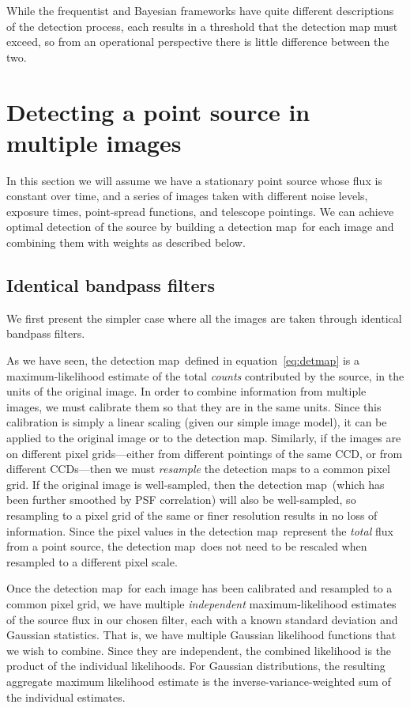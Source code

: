 \documentclass[11pt,letterpaper,linenumbers]{aastex7}
\newcommand{\equationname}{equation}
\newcommand{\eqnref}[1]{\mbox{\equationname~\ref{#1}}}
\newcommand{\detmap}{detection map}
\begin{document}
While the frequentist and Bayesian frameworks have quite different
descriptions of the detection process, each results in a threshold
that the detection map must exceed, so from an operational perspective
there is little difference between the two.


\section{Detecting a point source in multiple images}
\label{sec:multiimage}

In this section we will assume we have a stationary point source whose
flux is constant over time, and a series of images taken
with different noise levels, exposure
times, point-spread functions, and telescope pointings.  We can
achieve optimal detection of the source by building a \detmap\ for
each image and combining them with weights as described below.


\subsection{Identical bandpass filters}

We first present the simpler case where all the images are taken
through identical bandpass filters.

As we have seen, the \detmap\ defined in \eqnref{eq:detmap} is a
maximum-likelihood estimate of the total \emph{counts} contributed by
the source, in the units of the original image.  In order to
combine information from multiple images, we must calibrate them so
that they are in the same units.  Since this calibration is simply a
linear scaling (given our simple image model),
it can be applied to the original image or to the
\detmap.  Similarly, if the images are on different pixel
grids---either from different pointings of the same CCD, or from
different CCDs---then we must \emph{resample} the \detmap s to a
common pixel grid.
%
If the original image is well-sampled, then the \detmap\ (which has
been further smoothed by PSF correlation) will also be well-sampled,
so resampling to a pixel grid of the same or finer resolution results
in no loss of information.
%
Since the pixel values in the \detmap\ represent the \emph{total} flux
from a point source, the \detmap\ does not need to be rescaled when
resampled to a different pixel scale.



Once the \detmap\ for each image has been calibrated and resampled to
a common pixel grid, we have multiple \emph{independent}
maximum-likelihood estimates of the source flux in our chosen filter,
each with a known standard deviation and Gaussian statistics.  That
is, we have multiple Gaussian likelihood functions that we wish to
combine.  Since they are independent, the combined likelihood is the
product of the individual likelihoods.  For Gaussian distributions,
the resulting aggregate maximum likelihood estimate is the
inverse-variance-weighted sum of the individual estimates.
\end{document}
